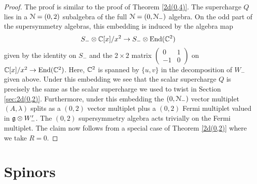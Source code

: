 \documentclass[10pt, oneside]{article}
\begin{document}
\begin{proof}
The proof is similar to the proof of Theorem \ref{2d(0,4)}.
The supercharge $Q$ lies in a $\mathcal N = (0,2)$ subalgebra of the full $\mathcal N = (0,\mathcal N_-)$ algebra.
On the odd part of the supersymmetry algebras, this embedding is induced by the algebra map
\[
S_- \otimes \mathbb C[x] / x^2 \to S_- \otimes {\rm End}(\mathbb C^2)
\]
given by the identity on $S_-$ and the $2 \times 2$ matrix $\begin{pmatrix} 0 &1 \\ -1 & 0 \end{pmatrix}$ on $\mathbb C[x]/x^2 \to {\rm End}(\mathbb C^2)$. 
Here, $\mathbb C^2$ is spanned by $\{u,v\}$ in the decomposition of $W_-$ given above.
Under this embedding we see that the scalar supercharge $Q$ is precisely the same as the scalar supercharge we used to twist in Section \ref{sec:2d(0,2)}. 
Furthermore, under this embedding the $(0,\mathcal N_-)$ vector multiplet $(A, \lambda)$ splits as a $(0,2)$ vector multiplet plus a $(0,2)$ Fermi multiplet valued in $\mathfrak g \otimes W_-'$. 
The $(0,2)$ supersymmetry algebra acts trivially on the Fermi multiplet. 
The claim now follows from a special case of Theorem \ref{2d(0,2)} where we take $R = 0$. 
%
\end{proof}

\appendix

\section{Spinors}
\label{sect:spinors}
\end{document}
